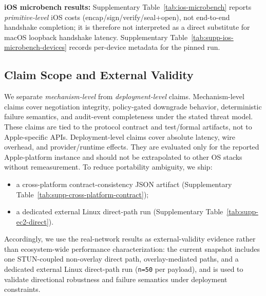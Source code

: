 \documentclass[10pt,journal,compsoc]{IEEEtran}
\providecommand{\tightlist}{%
  \setlength{\itemsep}{0pt}\setlength{\parskip}{0pt}}
\begin{document}
\textbf{iOS microbench results:} Supplementary
Table~\ref{tab:ios-microbench} reports \emph{primitive-level} iOS costs
(encap/sign/verify/seal+open), not end-to-end handshake completion; it
is therefore not interpreted as a direct substitute for macOS loopback
handshake latency. Supplementary
Table~\ref{tab:supp-ios-microbench-devices} records per-device metadata
for the pinned run.

\subsection{Claim Scope and External Validity}\label{sec:claim-scope-validity}

We separate \emph{mechanism-level} from \emph{deployment-level} claims.
Mechanism-level claims cover negotiation integrity, policy-gated
downgrade behavior, deterministic failure semantics, and audit-event
completeness under the stated threat model. These claims are tied to the
protocol contract and test/formal artifacts, not to Apple-specific APIs.
Deployment-level claims cover absolute latency, wire overhead, and
provider/runtime effects. They are evaluated only for the reported
Apple-platform instance and should not be extrapolated to other OS
stacks without remeasurement. To reduce portability ambiguity, we ship:
\begin{itemize}\tightlist
\item a cross-platform contract-consistency JSON artifact
(Supplementary Table~\ref{tab:supp-cross-platform-contract});
\item a dedicated external Linux direct-path run
(Supplementary Table~\ref{tab:supp-ec2-direct}).
\end{itemize}

Accordingly, we use the real-network results as external-validity
evidence rather than ecosystem-wide performance characterization: the
current snapshot includes one STUN-coupled non-overlay direct path,
overlay-mediated paths, and a dedicated external Linux direct-path run
(\texttt{n=50} per payload), and is used to validate directional
robustness and failure semantics under deployment constraints.
\end{document}
